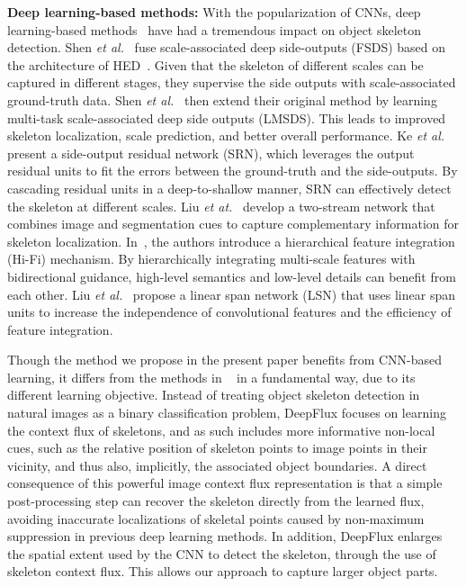 \documentclass[10pt,twocolumn,letterpaper]{article}
\begin{document}
\noindent\textbf{Deep learning-based methods:}
With the popularization of CNNs, deep learning-based methods~\cite{shen2016fsds,shen2017lmsds,ke2017srn,liu2017twostream,zhao2018hifi,liu2018lsn} have had a tremendous impact on object skeleton detection. Shen {\em et al.}~\cite{shen2016fsds} fuse scale-associated deep side-outputs (FSDS) based on the architecture of HED~\cite{xie2015hed}. Given that the skeleton of different scales can be captured in different stages, they supervise the side outputs with scale-associated ground-truth data. Shen {\em et al.}~\cite{shen2017lmsds} then extend their original method by learning multi-task scale-associated deep side outputs (LMSDS).
This leads to improved skeleton localization, scale prediction, and better overall performance. Ke {\em et al.}~\cite{ke2017srn} present a side-output residual network (SRN), which leverages the output residual units to fit the errors between the ground-truth and the side-outputs. By cascading residual units in a deep-to-shallow manner, SRN can effectively detect the skeleton at different scales. Liu {\em et at.}~\cite{liu2017twostream} develop a two-stream network that combines image and segmentation cues to capture complementary information for skeleton localization. In~\cite{zhao2018hifi}, the authors introduce a hierarchical feature integration (Hi-Fi) mechanism. By hierarchically integrating multi-scale features with bidirectional guidance, high-level semantics and low-level details can benefit from each other. Liu {\em et al.}~\cite{liu2018lsn} propose a linear span network (LSN) that uses linear span units to increase the independence of convolutional features and the efficiency of feature integration.

\medskip
Though the method we propose in the present paper benefits from CNN-based learning, it differs from the methods in  ~\cite{shen2016fsds,shen2017lmsds,ke2017srn,liu2017twostream,zhao2018hifi,liu2018lsn} in a fundamental way, due to its different learning objective. Instead of treating object skeleton detection in natural images as a binary classification problem, DeepFlux focuses on learning the context flux of skeletons, and as such includes more informative non-local cues, such as the relative position of skeleton points to image points in their vicinity, and thus also, implicitly, the associated object boundaries. A direct consequence of this powerful image context flux representation is that a simple post-processing step can recover the skeleton directly from the learned flux, avoiding inaccurate localizations of skeletal points caused by non-maximum suppression in previous deep learning methods.
In addition, DeepFlux enlarges the spatial extent used by the CNN to detect the skeleton, through the use of skeleton context flux. This allows our approach to capture larger object parts.
\end{document}
